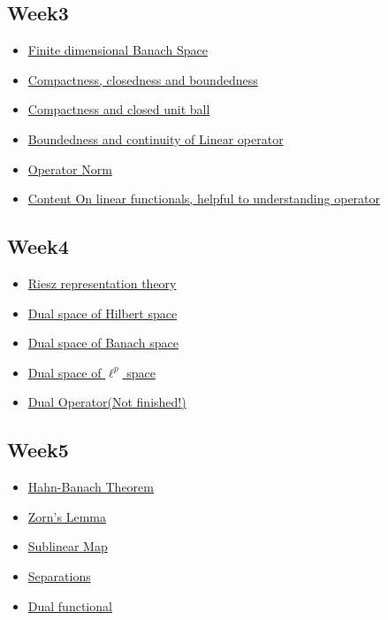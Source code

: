 \documentclass{article}
\begin{document}
\subsection{Week3}
\begin{itemize}
	\item \hyperref[finite dimensional Banach]{Finite dimensional Banach Space}

	\item \hyperref[compactness]{Compactness, closedness and boundedness}
	\item \hyperref[compact unit balls]{Compactness and closed unit ball}
	\item \hyperref[continuity of LO]{Boundedness and continuity of Linear operator}
	\item \hyperref[operator norm]{Operator Norm}
	\item \hyperref[Linear Functionals]{\color{red}Content On linear functionals, helpful to understanding operator}
\end{itemize}

\subsection{Week4}
\begin{itemize}
	\item \hyperref[Riesz representation theory]{Riesz representation theory}
	\item \hyperref[dual space Hilbert]{Dual space of Hilbert space}
	\item \hyperref[dual space Banach]{Dual space of Banach space}
	\item \hyperref[lp dual]{Dual space of $\ell^p$ space}
	\item \hyperref[dual operator]{Dual Operator(Not finished!)}
\end{itemize}

\subsection{Week5}
\begin{itemize}
	\item \hyperref[Hahn-Banach Theorem]{Hahn-Banach Theorem}
	\item \hyperref[Zorn's Lemma]{Zorn's Lemma}
	\item \hyperref[sublinear map]{Sublinear Map}
	\item \hyperref[separations]{Separations}
	\item \hyperref[Dual functional]{Dual functional}
\end{itemize}
\end{document}
